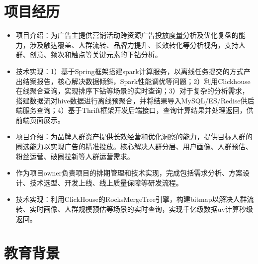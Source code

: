 \documentclass{resume}
\begin{document}
\section{项目经历}
\begin{itemize}
  \item 项目介绍：为广告主提供营销活动跨资源广告投放度量分析及优化复盘的能力，涉及触达覆盖、人群流转、品牌力提升、长效转化等分析视角，支持人群、创意、频次和触点等关键元素的下钻分析。
  \item 技术实现：1）基于Spring框架搭建spark计算服务，以离线任务提交的方式产出结案报告，核心解决数据倾斜，Spark性能调优等问题；2）利用Clickhouse在线聚合查询，实现排序下钻等场景的实时查询；3）对于复杂的分析需求，搭建数据流对hive数据进行离线预聚合，并将结果导入MySQL/ES/Redise供后端服务查询；4）基于Thrift框架开发后端接口，查询计算结果并处理返回，供前端页面展示。
\end{itemize}

\begin{itemize}
  \item 项目介绍：为品牌人群资产提供长效经营和优化洞察的能力，提供目标人群的圈选能力以实现广告的精准投放。核心解决人群分层、用户画像、人群预估、粉丝运营、破圈拉新等人群运营需求。
  \item 作为项目owner负责项目的排期管理和技术实现，完成包括需求分析、方案设计、技术选型、开发上线、线上质量保障等研发流程。
  \item 技术实现：利用ClickHouse的RocksMergeTree引擎，构建bitmap以解决人群流转、实时画像、人群规模预估等场景的实时查询，实现千亿级数据uv计算秒级返回。
\end{itemize}

\section{教育背景}
\end{document}
